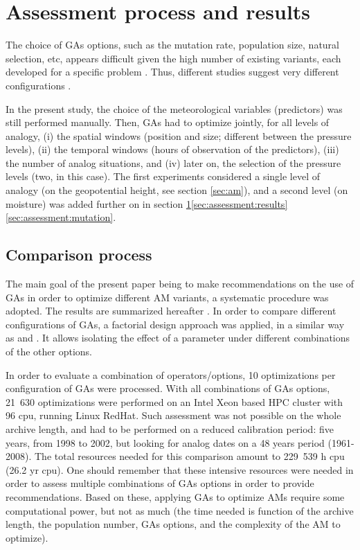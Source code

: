 \documentclass{ametsoc}
\begin{document}
\section{Assessment process and results}
\label{sec:assessment}

The choice of GAs options, such as the mutation rate, population size, natural selection, etc, appears difficult given the high number of existing variants, each developed for a specific problem \citep{Haupt2004, Costa2007a}. Thus, different studies suggest very different configurations \citep{DeJong1975a, Grefenstette1986, Back1996a, Back1996b}.

In the present study, the choice of the meteorological variables (predictors) was still performed manually. Then, GAs had to optimize jointly, for all levels of analogy, (i) the spatial windows (position and size; different between the pressure levels), (ii) the temporal windows (hours of observation of the predictors), (iii) the number of analog situations, and (iv) later on, the selection of the pressure levels (two, in this case). The first experiments considered a single level of analogy (on the geopotential height, see section \ref{sec:am}), and a second level (on moisture) was added further on in section \ref{sec:assessment}\ref{sec:assessment:results}\ref{sec:assessment:mutation}.


\subsection{Comparison process}

The main goal of the present paper being to make recommendations on the use of GAs in order to optimize different AM variants, a systematic procedure was adopted. The results are summarized hereafter \citep[see][for the details]{Horton2012a}. In order to compare different configurations of GAs, a factorial design approach was applied, in a similar way as \citet{Costa2005a,Costa2007a} and \citet{Mariano2010a}. It allows isolating the effect of a parameter under different combinations of the other options.

In order to evaluate a combination of operators/options, 10 optimizations per configuration of GAs were processed. With all combinations of GAs options, 21~630 optimizations were performed on an Intel Xeon based HPC cluster with 96 cpu, running Linux RedHat. Such assessment was not possible on the whole archive length, and had to be performed on a reduced calibration period: five years, from 1998 to 2002, but looking for analog dates on a 48 years period (1961-2008). The total resources needed for this comparison amount to 229~539 h cpu (26.2 yr cpu). One should remember that these intensive resources were needed in order to assess multiple combinations of GAs options in order to provide recommendations. Based on these, applying GAs to optimize AMs require some computational power, but not as much (the time needed is function of the archive length, the population number, GAs options, and the complexity of the AM to optimize). 
\end{document}
